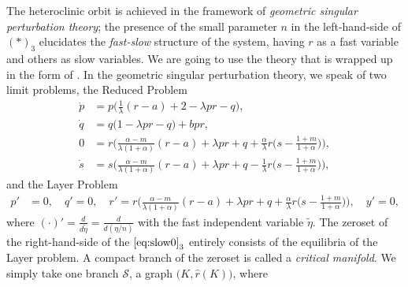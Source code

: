 \documentclass[a4paper,11pt]{article}
\theoremstyle{remark}
\begin{document}
The heteroclinic orbit is achieved in the framework of {\it geometric singular perturbation theory}; the presence of the small parameter $n$ in the left-hand-side of $(*)_3$ elucidates the {\it fast-slow} structure of the system, having $r$ as a fast variable and others as slow variables. We are going to use the theory that is wrapped up in the form of \cite[Theorem 2.2 and 3.1]{Sz1991}. In the geometric singular perturbation theory, we speak of two limit problems, the Reduced Problem
\begin{equation}\label{eq:slow0}
 \begin{aligned}
 \dot{p} &=p\Big(\frac{1}{\lambda}({r}-a) + 2- \lambda p {r} -q\Big),\\%
 \dot{q} &=q\Big(1 -\lambda p {r} -q\Big) + b p {r},\\%
 0&=r\Big(\frac{\alpha-m}{\lambda(1+\alpha)}(r-a) + \lambda pr + q +\frac{\alpha}{\lambda}r\big(s- \frac{1+m}{1+\alpha}\big)\Big),\\
 \dot{s} &=s\Big(\frac{\alpha-m}{\lambda(1+\alpha)}({r}-a) + \lambda p{r} + q - \frac{1}{\lambda}{r}\big(s- \frac{1+m}{1+\alpha}\big)\Big),%
 \end{aligned}
\end{equation}
and the Layer Problem
\begin{equation} \label{eq:fast0}
 \begin{aligned}
 {p}' &=0, \quad {q}' =0, \quad {r}' =r\Big(\frac{\alpha-m}{\lambda(1+\alpha)}(r-a) + \lambda pr + q +\frac{\alpha}{\lambda}r\big(s- \frac{1+m}{1+\alpha}\big)\Big), \quad{y}' =0,
 \end{aligned}
\end{equation}
where $(\cdot)'= \frac{d}{d\tilde{\eta}} = \frac{d}{d(\eta/n)}$ with the fast independent variable $\tilde{\eta}$. The zeroset of the right-hand-side of the $\eqref{eq:slow0}_3$ entirely consists of the equilibria of the Layer problem. A compact branch of the zeroset is called a {\it critical manifold}. We simply take one branch $\mathcal{S}$, a graph $\big(K,\hat{r}(K)\big)$, where
\end{document}
